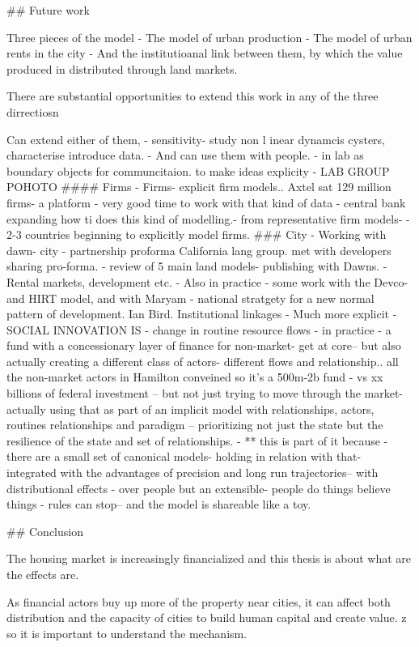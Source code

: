 ## Future work

Three pieces of the model 
- The model of urban production
- The model of urban rents in the city
- And the institutioanal link between them, by which the value produced in distributed through land markets.

There are substantial opportunities to extend this work in any of the three dirrectiosn

Can extend either of them,
- sensitivity- study non l inear dynamcis cysters, characterise introduce data.
- And can use them with people. - in lab as boundary objects for communcitaion. to make ideas explicity - LAB GROUP POHOTO
#### Firms
- Firms- explicit firm models.. Axtel sat 129 million firms- a platform - very good time to work with that kind of data
- central bank expanding how ti does this kind of modelling.- from representative firm models- - 2-3 countries beginning to explicitly model firms.
### City
- Working with dawn- city - partnership proforma California lang group. met with developers sharing pro-forma. - review of 5 main land models- publishing with Dawns. - Rental markets, development etc.
- Also in practice - some work with the Devco- and HIRT model, and with Maryam - national stratgety for a new normal pattern of development. Ian Bird.
Institutional linkages
- Much more explicit - SOCIAL INNOVATION IS - change in routine resource flows
- in practice - a fund with a concessionary layer of finance for non-market- get at core-- but also actually creating a different class of actors- different flows and relationship.. all the non-market actors in Hamilton conveined so it's a 500m-2b fund - vs xx billions of federal investment -- but not just trying to move through the market- actually using that as part of an implicit model with relationships, actors, routines relationships and paradigm -- prioritizing not just the state but the resilience of the state and set of relationships.
- ** this is part of it because - there are a small set of canonical models- holding in relation with that- integrated with the advantages of precision and long run trajectories-- with distributional effects - over people but an extensible- people do things believe things - rules can stop-- and the model is shareable like a toy.

## Conclusion


The housing market is increasingly financialized and this thesis is about what are the effects are. 

As financial actors buy up more of the property near cities, it can affect both distribution and the capacity of cities to build human capital and create value. z
so it is important to understand the mechanism.


